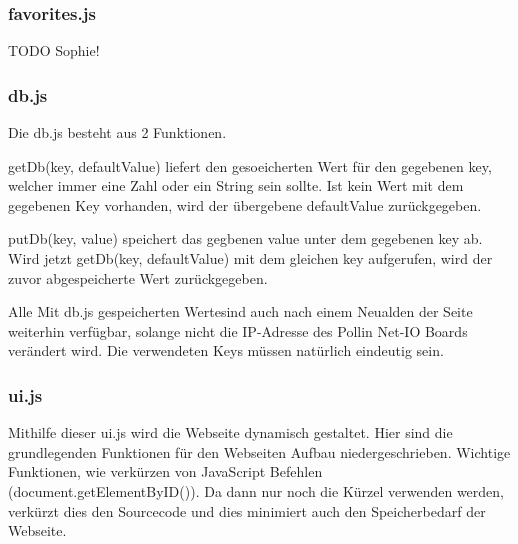 \subsubsection{favorites.js}
TODO Sophie!


\subsubsection{db.js}
Die \textrm{db.js} besteht aus 2 Funktionen. 

\textrm{getDb(key, defaultValue)} liefert den gesoeicherten Wert für den
gegebenen \textrm{key}, welcher immer eine Zahl oder ein String sein sollte. Ist
kein Wert mit dem gegebenen Key vorhanden, wird der
übergebene \textrm{defaultValue} zurückgegeben.

\textrm{putDb(key, value)} speichert das gegbenen \textrm{value} unter dem
gegebenen \textrm{key} ab. Wird jetzt \textrm{getDb(key, defaultValue)} mit dem
gleichen \textrm{key} aufgerufen, wird der zuvor abgespeicherte Wert
zurückgegeben.

Alle Mit \textrm{db.js} gespeicherten Wertesind auch nach einem Neualden der
Seite weiterhin verfügbar, solange nicht die IP-Adresse des Pollin Net-IO Boards
verändert wird. Die verwendeten Keys müssen natürlich eindeutig sein.

\subsubsection{ui.js}
Mithilfe dieser ui.js wird die Webseite dynamisch gestaltet. Hier sind die
grundlegenden Funktionen für den Webseiten Aufbau niedergeschrieben.\newline
Wichtige Funktionen, wie verkürzen von JavaScript Befehlen
(document.getElementByID()). Da dann nur noch die Kürzel verwenden werden,
verkürzt dies den Sourcecode und dies minimiert auch den Speicherbedarf der
Webseite.\newline

